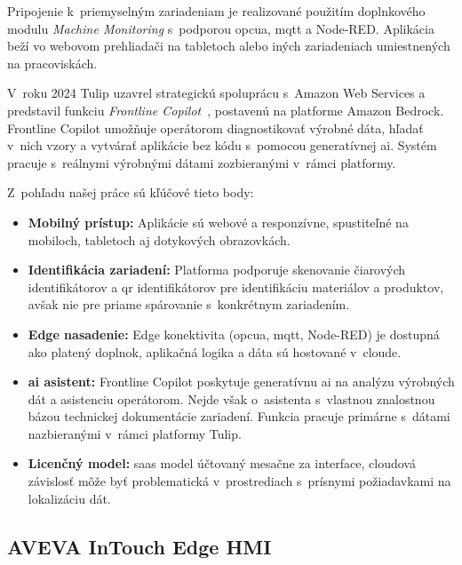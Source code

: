 Pripojenie k~priemyselným zariadeniam je realizované použitím doplnkového modulu
\textit{Machine Monitoring} s~podporou \acrshort{opcua}, \acrshort{mqtt} a
Node-RED. Aplikácia beží vo webovom prehliadači na tabletoch alebo iných
zariadeniach umiestnených na pracoviskách.

V~roku 2024 Tulip uzavrel strategickú spoluprácu s~Amazon Web Services a
predstavil funkciu \textit{Frontline Copilot}~\cite{t05}, postavenú na
platforme Amazon Bedrock. Frontline Copilot umožňuje operátorom diagnostikovať
výrobné dáta, hľadať v~nich vzory a vytvárať aplikácie bez kódu s~pomocou
generatívnej \acrshort{ai}. Systém pracuje s~reálnymi výrobnými dátami
zozbieranými v~rámci platformy.

Z~pohľadu našej práce sú kľúčové tieto body:

\begin{itemize}
      \item \textbf{Mobilný prístup:} Aplikácie sú webové a responzívne,
            spustiteľné na mobiloch, tabletoch aj dotykových obrazovkách.
      \item \textbf{Identifikácia zariadení:} Platforma podporuje skenovanie
            čiarových identifikátorov a \acrshort{qr} identifikátorov pre identifikáciu materiálov
            a produktov, avšak nie pre priame spárovanie s~konkrétnym
            zariadením.
      \item \textbf{Edge nasadenie:} Edge konektivita (\acrshort{opcua}, \acrshort{mqtt},
            Node-RED) je dostupná ako platený doplnok, aplikačná logika
            a dáta sú hostované v~cloude.
      \item \textbf{\acrshort{ai} asistent:} Frontline Copilot poskytuje generatívnu
            \acrshort{ai} na analýzu výrobných dát a asistenciu operátorom.
            Nejde však o~asistenta s~vlastnou znalostnou bázou technickej
            dokumentácie zariadení. Funkcia pracuje primárne s~dátami
            nazbieranými v~rámci platformy Tulip.
      \item \textbf{Licenčný model:} \acrshort{saas} model účtovaný mesačne
            za interface, cloudová závislosť môže byť problematická
            v~prostrediach s~prísnymi požiadavkami na lokalizáciu dát.
\end{itemize}

\subsection{AVEVA InTouch Edge HMI}

